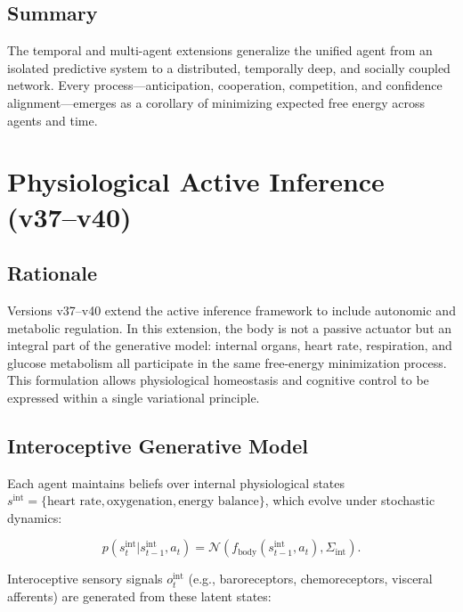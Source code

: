 \documentclass[9pt]{elife}
\begin{document}
\subsection{Summary}

The temporal and multi-agent extensions generalize the unified agent
from an isolated predictive system to a distributed, temporally deep,
and socially coupled network.
Every process—anticipation, cooperation, competition, and
confidence alignment—emerges as a corollary of minimizing
expected free energy across agents and time.

\section{Physiological Active Inference (v37–v40)}

\subsection{Rationale}

Versions v37–v40 extend the active inference framework to include
autonomic and metabolic regulation.
In this extension, the body is not a passive actuator but an
integral part of the generative model:
internal organs, heart rate, respiration, and glucose metabolism
all participate in the same free-energy minimization process.
This formulation allows physiological homeostasis and cognitive control
to be expressed within a single variational principle.

\subsection{Interoceptive Generative Model}

Each agent maintains beliefs over internal physiological states
$s^{\mathrm{int}} = \{\text{heart rate}, \text{oxygenation}, \text{energy balance}\}$,
which evolve under stochastic dynamics:

\begin{equation}
p(s_t^{\mathrm{int}} | s_{t-1}^{\mathrm{int}}, a_t)
 = \mathcal{N}( f_{\mathrm{body}}(s_{t-1}^{\mathrm{int}}, a_t), \Sigma_{\mathrm{int}} ).
\end{equation}

Interoceptive sensory signals $o_t^{\mathrm{int}}$ (e.g., baroreceptors,
chemoreceptors, visceral afferents) are generated from these latent states:
\end{document}
